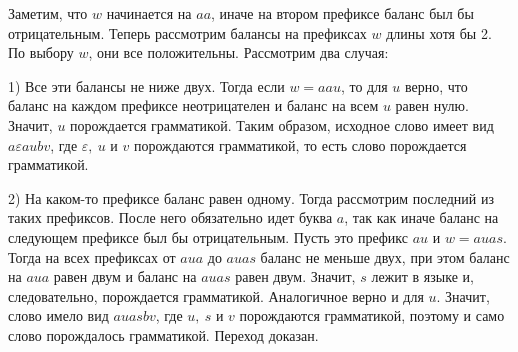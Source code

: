 \documentclass[12pt]{article}
\newenvironment{Problems}{
	\begin{enumerate}[]
	}{       
	\end{enumerate}
}
\begin{document}
\begin{Problems}
		Заметим, что $w$ начинается на $aa$, иначе на втором префиксе баланс был бы отрицательным. Теперь рассмотрим балансы на префиксах $w$ длины хотя бы 2. По выбору $w$, они все положительны. Рассмотрим два случая:
		
		1) Все эти балансы не ниже двух. Тогда если $w = aau$, то для $u$ верно, что баланс на каждом префиксе неотрицателен и баланс на всем $u$ равен нулю. Значит, $u$ порождается грамматикой. Таким образом, исходное слово имеет вид $a\varepsilon aubv$, где $\varepsilon,\ u$ и $v$ порождаются грамматикой, то есть слово порождается грамматикой.
		
		2) На каком-то префиксе баланс равен одному. Тогда рассмотрим последний из таких префиксов. После него обязательно идет буква $a$, так как иначе баланс на следующем префиксе был бы отрицательным. Пусть это префикс $au$ и $w = auas$. Тогда на всех  префиксах от $aua$ до $auas$ баланс не меньше двух, при этом баланс на $aua$ равен двум и баланс на $auas$ равен двум. Значит, $s$ лежит в языке и, следовательно, порождается грамматикой. Аналогичное верно и для $u$. Значит, слово имело вид $auasbv$, где $u,\ s$ и $v$ порождаются грамматикой, поэтому и само слово порождалось грамматикой. Переход доказан.\\
	\end{Problems}
	
\end{document}
